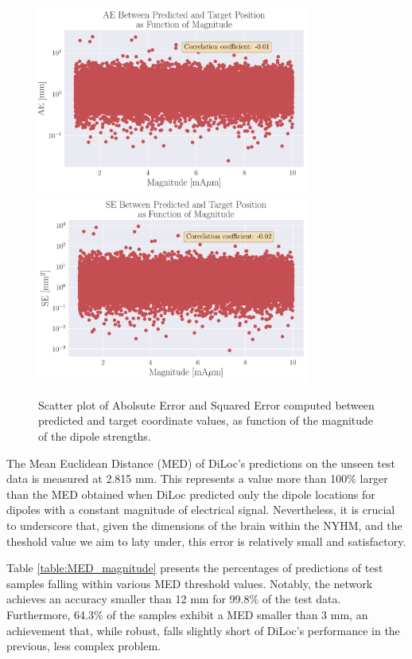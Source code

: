 \documentclass[a4paper, UKenglish, 11pt]{uiomaster}
\begin{document}
\begin{figure}
  \hspace*{-3cm} %
  \includegraphics[width=9cm]{figures/NN_magnitude/mae_amplitude.pdf}
  \includegraphics[width=9cm]{figures/NN_magnitude/mse_amplitude.pdf}
  \caption{Scatter plot of Abolsute Error and Squared Error computed between predicted and target coordinate values, as function of the magnitude of the dipole strengths.}
  \label{fig:magnitude_errors}
\end{figure}

The Mean Euclidean Distance (MED) of DiLoc's predictions on the unseen test data is measured at 2.815 mm. This represents a value more than 100$\%$ larger than the MED obtained when DiLoc predicted only the dipole locations for dipoles with a constant magnitude of electrical signal. Nevertheless, it is crucial to underscore that, given the dimensions of the brain within the NYHM, and the theshold value we aim to laty under, this error is relatively small and satisfactory.

Table \ref{table:MED_magnitude} presents the percentages of predictions of test samples falling within various MED threshold values. Notably, the network achieves an accuracy smaller than 12 mm for 99.8$\%$ of the test data. Furthermore, 64.3$\%$ of the samples exhibit a MED smaller than 3 mm, an achievement that, while robust, falls slightly short of DiLoc's performance in the previous, less complex problem.
\end{document}
